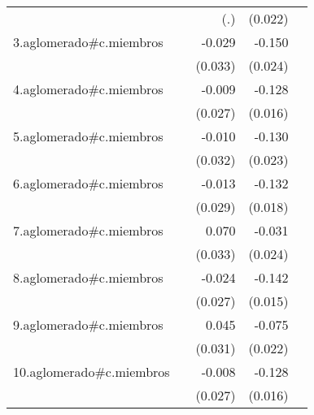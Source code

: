 {\begin{longtable}{l*{4}{D{.}{.}{-1}}}
            &                     &         (.)         &     (0.022)         &                     \\
\addlinespace
3.aglomerado#c.miembros&                     &      -0.029         &      -0.150\sym{***}&                     \\
            &                     &     (0.033)         &     (0.024)         &                     \\
\addlinespace
4.aglomerado#c.miembros&                     &      -0.009         &      -0.128\sym{***}&                     \\
            &                     &     (0.027)         &     (0.016)         &                     \\
\addlinespace
5.aglomerado#c.miembros&                     &      -0.010         &      -0.130\sym{***}&                     \\
            &                     &     (0.032)         &     (0.023)         &                     \\
\addlinespace
6.aglomerado#c.miembros&                     &      -0.013         &      -0.132\sym{***}&                     \\
            &                     &     (0.029)         &     (0.018)         &                     \\
\addlinespace
7.aglomerado#c.miembros&                     &       0.070\sym{*}  &      -0.031         &                     \\
            &                     &     (0.033)         &     (0.024)         &                     \\
\addlinespace
8.aglomerado#c.miembros&                     &      -0.024         &      -0.142\sym{***}&                     \\
            &                     &     (0.027)         &     (0.015)         &                     \\
\addlinespace
9.aglomerado#c.miembros&                     &       0.045         &      -0.075\sym{***}&                     \\
            &                     &     (0.031)         &     (0.022)         &                     \\
\addlinespace
10.aglomerado#c.miembros&                     &      -0.008         &      -0.128\sym{***}&                     \\
            &                     &     (0.027)         &     (0.016)         &                     \\

\end{longtable}}
